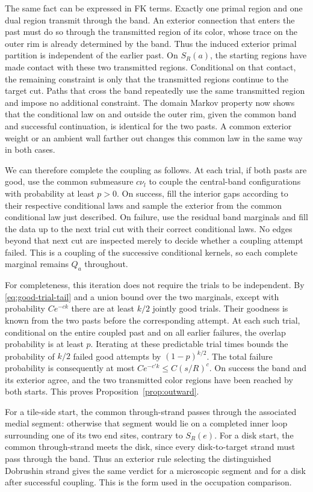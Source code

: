 The same fact can be expressed in FK terms.  Exactly one primal
region and one dual region transmit through the band.  An
exterior connection that enters the past must do so through the
transmitted region of its color, whose trace on the outer rim is
already determined by the band.  Thus the induced exterior
primal partition is independent of the earlier past.  On $S_R(a)$,
the starting regions have made contact with these two transmitted
regions.  Conditional on that contact, the remaining constraint
is only that the transmitted regions continue to the target
cut.  Paths that cross the band repeatedly use the same
transmitted region and impose no additional constraint.  The
domain Markov property now shows that the conditional law on
and outside the outer rim, given the common band and successful
continuation, is identical for the two pasts.  A common exterior
weight or an ambient wall farther out changes this common law
in the same way in both cases.

We can therefore complete the coupling as follows.  At each trial,
if both pasts are good, use the common submeasure $c\nu_l$ to
couple the central-band configurations with probability at least
$p>0$.  On success, fill the interior gaps according to their
respective conditional laws and sample the exterior from the
common conditional law just described.  On failure, use the
residual band marginals and fill the data up to the next trial
cut with their correct conditional laws.  No edges beyond that
next cut are inspected merely to decide whether a coupling
attempt failed.  This is a coupling of the successive conditional
kernels, so each complete marginal remains $Q_a$ throughout.

For completeness, this iteration does not require the trials to
be independent.  By \eqref{eq:good-trial-tail} and a union bound
over the two marginals, except with probability $Ce^{-c k}$
there are at least $k/2$ jointly good trials.  Their goodness is
known from the two pasts before the corresponding attempt.
At each such trial, conditional on the entire coupled past and
on all earlier failures, the overlap probability is at least
$p$.  Iterating at these predictable trial times bounds the
probability of $k/2$ failed good attempts by $(1-p)^{k/2}$.
The total failure probability is consequently at most
$Ce^{-c'k}\le C(s/R)^c$.  On success the band and its exterior
agree, and the two transmitted color regions have been reached
by both starts.  This proves Proposition~\ref{prop:outward}.

For a tile-side start, the common through-strand passes through
the associated medial segment: otherwise that segment would lie
on a completed inner loop surrounding one of its two end sites,
contrary to $S_R(e)$.  For a disk start, the common through-strand
meets the disk, since every disk-to-target strand must pass
through the band.  Thus an exterior rule selecting the
distinguished Dobrushin strand gives the same verdict for a
microscopic segment and for a disk after successful coupling.
This is the form used in the occupation comparison.
